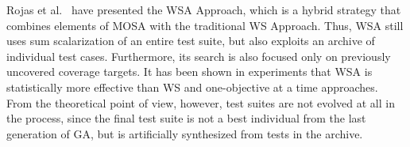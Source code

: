 \documentclass[paper=a4,%
  twoside,%
  BCOR4mm,%
  abstract=true,%
  toc=bibliography,%
  chapterprefix=true,%
  toc=bibliographynumbered,%
  open=right,%
  english,%
  pagesize=pdftex]{scrreprt}
\begin{document}


Rojas et al.~\cite{Rojas2017} have presented the \ac{WSA} Approach, which is a hybrid strategy that combines elements of \ac{MOSA} with the traditional \ac{WS} Approach. Thus, \ac{WSA} still uses sum scalarization of an entire test suite, but also exploits an archive of individual test cases. Furthermore, its search is also focused only on previously uncovered coverage targets. It has been shown in experiments that \ac{WSA} is statistically more effective than \ac{WS} and one-objective at a time approaches. From the theoretical point of view, however, test suites are not evolved at all in the process, since the final test suite is not a best individual from the last generation of \ac{GA}, but is artificially synthesized from tests in the archive.
\end{document}
